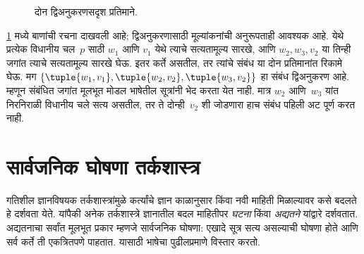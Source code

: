 \begin{figure}
  \begin{center}
  \end{center}
  \caption{दोन द्विअनुकरणसदृश प्रतिमाने.}
  \label{aml:el:bsd:fig:bisimilar}
\end{figure}

\ref{aml:el:bsd:fig:bisimilar} मध्ये बाणांची रचना दाखवली आहे;
द्विअनुकरणासाठी मूल्यांकनांची अनुरूपताही आवश्यक आहे.
येथे प्रत्येक विधानीय चल~$p$ साठी
$w_1$ आणि $v_1$ येथे त्याचे सत्यतामूल्य सारखे,
आणि $w_2,w_3,v_2$ या तिन्ही जगांत त्याचे सत्यतामूल्य
सारखे घेऊ. इतर कर्ते असतील, तर त्यांचे संबंध या
दोन प्रतिमानांत रिकामे घेऊ. मग
$\{\tuple{w_1,v_1},\tuple{w_2,v_2},\tuple{w_3,v_2}\}$
हा संबंध द्विअनुकरण आहे. म्हणून संबंधित जगांत मूलभूत
मोडल भाषेतील सूत्रांनी भेद करता येत नाही. मात्र
$w_2$ आणि~$w_3$ यांत निरनिराळी विधानीय चले
सत्य असतील, तर ते दोन्ही~$v_2$ शी जोडणारा हाच
संबंध पहिली अट पूर्ण करत नाही.












\section{सार्वजनिक घोषणा तर्कशास्त्र}\label{aml:el:pal:sec}

गतिशील ज्ञानविषयक तर्कशास्त्रांमुळे कर्त्यांचे ज्ञान
काळानुसार किंवा नवी माहिती मिळाल्यावर कसे बदलते हे
दर्शवता येते. यांपैकी अनेक तर्कशास्त्रे ज्ञानातील बदल
माहितीपर \emph{घटना} किंवा \emph{अद्यतने} यांद्वारे
दर्शवतात. अद्यतनाचा सर्वांत मूलभूत प्रकार म्हणजे
सार्वजनिक घोषणा: एखादे सूत्र सत्य असल्याची घोषणा
होते आणि सर्व कर्ते ती एकत्रितपणे पाहतात. यासाठी
भाषेचा पुढीलप्रमाणे विस्तार करतो.

